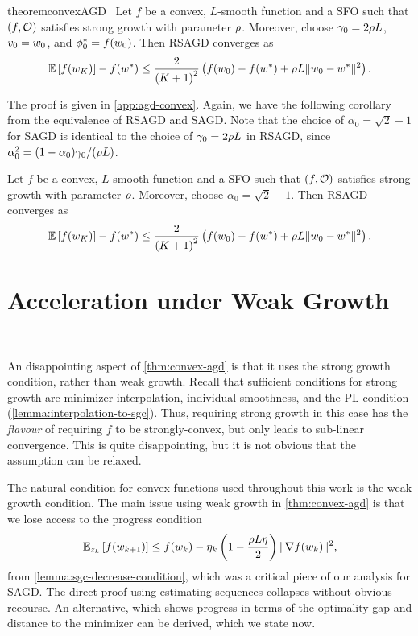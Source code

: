 \begin{restatable}{theorem}{convexAGD}~\label{thm:convex-agd}
    Let \( f \) be a convex, \( L \)-smooth function and \oracle{} a \ac{SFO} such that \( \rbr{f, \oracle{}} \) satisfies strong growth with parameter \( \sgc \).
    Moreover, choose \( \gamma_0 = 2 \sgc L \), \( v_0 = \w_0 \), and \( \phi_0^* = f(\w_0) \).
    Then \ac{RSAGD} converges as  
    \[ \E\sbr{f(\w_K)} - f(\wopt) \leq \frac{2}{\rbr{K+1}^2}\rbr{f(\w_0) - f(\wopt) + \sgc L \norm{\w_0 - \wopt}^2 }. \]
\end{restatable}

\noindent The proof is given in \autoref{app:agd-convex}.
Again, we have the following corollary from the equivalence of \ac{RSAGD} and \ac{SAGD}. 
Note that the choice of \( \alpha_0 = \sqrt{2} - 1 \) for \ac{SAGD} is identical to the choice of \( \gamma_0 = 2 \sgc L \) in \ac{RSAGD}, since \( \alpha_0^2 = (1 - \alpha_0) \gamma_0 / (\sgc L) \).

\begin{corollary}
    Let \( f \) be a convex, \( L \)-smooth function and \oracle{} a \ac{SFO} such that \( \rbr{f, \oracle{}} \) satisfies strong growth with parameter \( \sgc \).
    Moreover, choose \( \alpha_0 = \sqrt{2} - 1 \).
    Then \ac{RSAGD} converges as  
    \[ \E\sbr{f(\w_K)} - f(\wopt) \leq \frac{2}{\rbr{K+1}^2}\rbr{f(\w_0) - f(\wopt) + \sgc L \norm{\w_0 - \wopt}^2 }. \]
\end{corollary}

\section{Acceleration under Weak Growth}~\label{sec:agd-weak-growth}

 An disappointing aspect of \autoref{thm:convex-agd} is that it uses the strong growth condition, rather than weak growth.
 Recall that sufficient conditions for strong growth are minimizer interpolation, individual-smoothness, and the \ac{PL} condition (\autoref{lemma:interpolation-to-sgc}). 
 Thus, requiring strong growth in this case has the \emph{flavour} of requiring \( f \) to be strongly-convex, but only leads to sub-linear convergence.
This is quite disappointing, but it is not obvious that the assumption can be relaxed.

The natural condition for convex functions used throughout this work is the weak growth condition.
The main issue using weak growth in \autoref{thm:convex-agd} is that we lose access to the progress condition 
\[ \Ek \sbr{f(\wkk)} \leq f(\wk) - \etak \rbr{1 - \frac{\sgc L \eta}{2}} \norm{\grad(\wk)}^2, \]
from \autoref{lemma:sgc-decrease-condition}, which was a critical piece of our analysis for \ac{SAGD}. 
The direct proof using estimating sequences collapses without obvious recourse.
\iflong%
An alternative, which shows progress in terms of the optimality gap and distance to the minimizer can be derived, which we state now.

